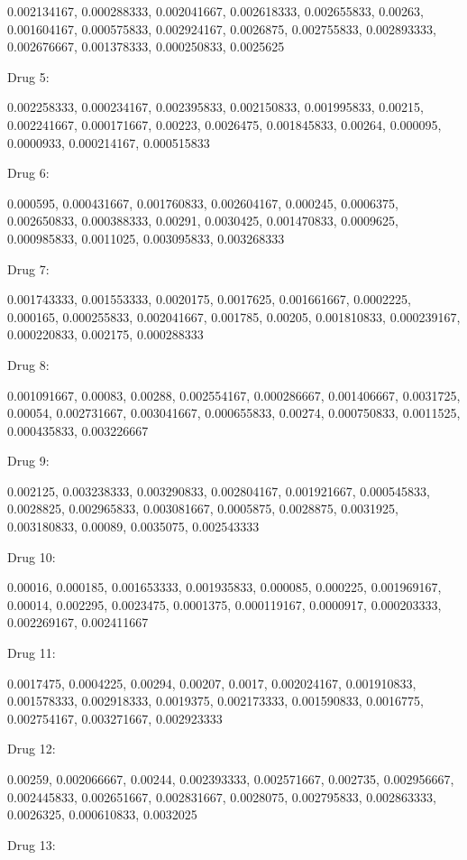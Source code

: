 \documentclass[12pt]{amsart}
\theoremstyle{plain}
\theoremstyle{definition}
\begin{document}
{0.002134167, 0.000288333, 0.002041667, 0.002618333, 0.002655833, 0.00263, 0.001604167, 0.000575833, 0.002924167, 0.0026875, 0.002755833, 0.002893333, 0.002676667, 0.001378333, 0.000250833, 0.0025625

\bigskip
Drug 5:

0.002258333, 0.000234167, 0.002395833, 0.002150833, 0.001995833, 0.00215, 0.002241667, 0.000171667, 0.00223, 0.0026475, 0.001845833, 0.00264, 0.000095, 0.0000933, 0.000214167, 0.000515833

\newpage
Drug 6:

0.000595, 0.000431667, 0.001760833, 0.002604167, 0.000245, 0.0006375, 0.002650833, 0.000388333, 0.00291, 0.0030425, 0.001470833, 0.0009625, 0.000985833, 0.0011025, 0.003095833, 0.003268333

\bigskip
Drug 7:

0.001743333, 0.001553333, 0.0020175, 0.0017625, 0.001661667, 0.0002225, 0.000165, 0.000255833, 0.002041667, 0.001785, 0.00205, 0.001810833, 0.000239167, 0.000220833, 0.002175, 0.000288333

\bigskip
Drug 8:

0.001091667, 0.00083, 0.00288, 0.002554167, 0.000286667, 0.001406667, 0.0031725, 0.00054, 0.002731667, 0.003041667, 0.000655833, 0.00274, 0.000750833, 0.0011525, 0.000435833, 0.003226667

\bigskip
Drug 9:

0.002125, 0.003238333, 0.003290833, 0.002804167, 0.001921667, 0.000545833, 0.0028825, 0.002965833, 0.003081667, 0.0005875, 0.0028875, 0.0031925, 0.003180833, 0.00089, 0.0035075, 0.002543333

\bigskip
Drug 10: 
     
0.00016, 0.000185, 0.001653333, 0.001935833, 0.000085, 0.000225, 0.001969167, 0.00014, 0.002295, 0.0023475, 0.0001375, 0.000119167, 0.0000917, 0.000203333, 0.002269167, 0.002411667

\newpage
Drug 11:

0.0017475, 0.0004225, 0.00294, 0.00207, 0.0017, 0.002024167, 0.001910833, 0.001578333, 0.002918333, 0.0019375, 0.002173333, 0.001590833, 0.0016775, 0.002754167, 0.003271667, 0.002923333

\bigskip
Drug 12:

0.00259, 0.002066667, 0.00244, 0.002393333, 0.002571667, 0.002735, 0.002956667, 0.002445833, 0.002651667, 0.002831667, 0.0028075, 0.002795833, 0.002863333, 0.0026325, 0.000610833, 0.0032025

\bigskip
Drug 13: 

}
\end{document}
